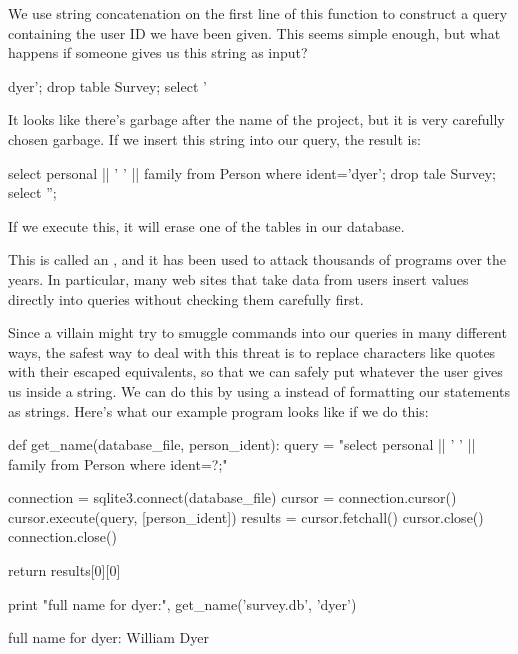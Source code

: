 \documentclass{book}
\begin{document}
We use string concatenation on the first line of this function to
construct a query containing the user ID we have been given. This seems
simple enough, but what happens if someone gives us this string as
input?

\begin{VerbOut}
dyer'; drop table Survey; select '
\end{VerbOut}

It looks like there's garbage after the name of the project, but it is
very carefully chosen garbage. If we insert this string into our query,
the result is:

\begin{VerbIn}
select personal || ' ' || family from Person where ident='dyer'; drop tale Survey; select '';
\end{VerbIn}

If we execute this, it will erase one of the tables in our database.

This is called an , and it has been used to attack thousands of programs over the
years. In particular, many web sites that take data from users insert
values directly into queries without checking them carefully first.

Since a villain might try to smuggle commands into our queries in many
different ways, the safest way to deal with this threat is to replace
characters like quotes with their escaped equivalents, so that we can
safely put whatever the user gives us inside a string. We can do this by
using a  instead of
formatting our statements as strings. Here's what our example program
looks like if we do this:

\begin{VerbIn}
def get_name(database_file, person_ident):
    query = "select personal || ' ' || family from Person where ident=?;"

    connection = sqlite3.connect(database_file)
    cursor = connection.cursor()
    cursor.execute(query, [person_ident])
    results = cursor.fetchall()
    cursor.close()
    connection.close()

    return results[0][0]

print "full name for dyer:", get_name('survey.db', 'dyer')
\end{VerbIn}

\begin{VerbOut}
full name for dyer: William Dyer
\end{VerbOut}
\end{document}
